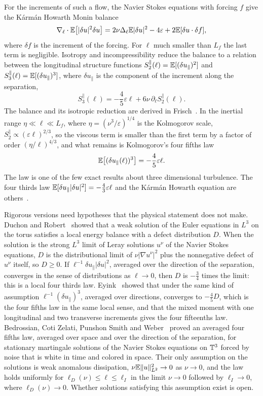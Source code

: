 For the increments of such a flow, the Navier Stokes equations with forcing $f$ give the K\'arm\'an Howarth Monin balance
\[
\nabla_\ell\cdot\mathbb{E}\big[|\delta u|^2\delta u\big] = 2\nu\Delta_\ell\mathbb{E}|\delta u|^2-4\varepsilon+2\mathbb{E}[\delta u\cdot\delta f],
\]
where $\delta f$ is the increment of the forcing. For $\ell$ much smaller than $L_f$ the last term is negligible. Isotropy and incompressibility reduce the balance to a relation between the longitudinal structure functions $S_2^\parallel(\ell) = \mathbb{E}[(\delta u_\parallel)^2]$ and $S_3^\parallel(\ell) = \mathbb{E}[(\delta u_\parallel)^3]$, where $\delta u_\parallel$ is the component of the increment along the separation,
\begin{equation}\label{eq:kh_exact}
S_3^\parallel(\ell) = -\frac45\varepsilon\ell+6\nu\,\partial_\ell S_2^\parallel(\ell).
\end{equation}
The balance and its isotropic reduction are derived in Frisch~\cite{frisch1995}. In the inertial range $\eta\ll\ell\ll L_f$, where $\eta = (\nu^3/\varepsilon)^{1/4}$ is the Kolmogorov scale, $S_2^\parallel\propto(\varepsilon\ell)^{2/3}$, so the viscous term is smaller than the first term by a factor of order $(\eta/\ell)^{4/3}$, and what remains is Kolmogorov's four fifths law
\begin{equation}\label{eq:fourfifths}
\mathbb{E}\big[(\delta u_\parallel(\ell))^3\big] = -\frac45\varepsilon\ell.
\end{equation}
The law is one of the few exact results about three dimensional turbulence. The four thirds law $\mathbb{E}[\delta u_\parallel|\delta u|^2] = -\frac43\varepsilon\ell$ and the K\'arm\'an Howarth equation are others~\cite{frisch1995}.

Rigorous versions need hypotheses that the physical statement does not make. Duchon and Robert~\cite{duchonrobert2000} showed that a weak solution of the Euler equations in $L^3$ on the torus satisfies a local energy balance with a defect distribution $D$. When the solution is the strong $L^3$ limit of Leray solutions $u^\nu$ of the Navier Stokes equations, $D$ is the distributional limit of $\nu|\nabla u^\nu|^2$ plus the nonnegative defect of $u^\nu$ itself, so $D\geq0$. If $\ell^{-1}\delta u_\parallel|\delta u|^2$, averaged over the direction of the separation, converges in the sense of distributions as $\ell\to0$, then $D$ is $-\frac34$ times the limit: this is a local four thirds law. Eyink~\cite{eyink2003} showed that under the same kind of assumption $\ell^{-1}(\delta u_\parallel)^3$, averaged over directions, converges to $-\frac45D$, which is the four fifths law in the same local sense, and that the mixed moment with one longitudinal and two transverse increments gives the four fifteenths law. Bedrossian, Coti Zelati, Punshon Smith and Weber~\cite{bcpw2019} proved an averaged four fifths law, averaged over space and over the direction of the separation, for stationary martingale solutions of the Navier Stokes equations on $\mathbb{T}^3$ forced by noise that is white in time and colored in space. Their only assumption on the solutions is weak anomalous dissipation, $\nu\mathbb{E}\|u\|_{L^2}^2\to0$ as $\nu\to0$, and the law holds uniformly for $\ell_D(\nu)\leq\ell\leq\ell_I$ in the limit $\nu\to0$ followed by $\ell_I\to0$, where $\ell_D(\nu)\to0$. Whether solutions satisfying this assumption exist is open.

